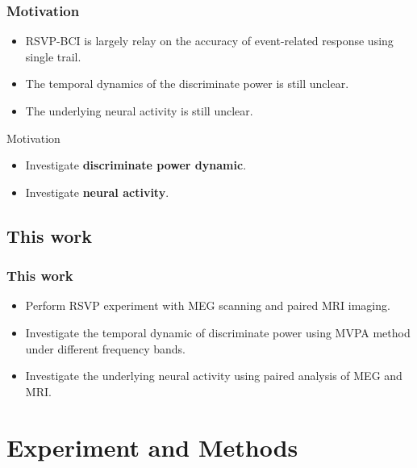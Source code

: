 \documentclass[aspectratio=169]{beamer}
\begin{document}
\begin{frame}
    \frametitle{Motivation}

    \begin{itemize}
        \item RSVP-BCI is largely relay on the accuracy of event-related response using single trail.
        \item The temporal dynamics of the discriminate power is still unclear.
        \item The underlying neural activity is still unclear.
    \end{itemize}

    \pause

    \begin{block}{Motivation}

        \begin{itemize}
            \item Investigate \textbf{discriminate power dynamic}.
            \item Investigate \textbf{neural activity}.
        \end{itemize}

    \end{block}

\end{frame}

\subsection{This work}

\begin{frame}
    \frametitle{This work}

    \begin{itemize}
        \item Perform RSVP experiment with MEG scanning and paired MRI imaging.
        \item Investigate the temporal dynamic of discriminate power using MVPA method under different frequency bands.
        \item Investigate the underlying neural activity using paired analysis of MEG and MRI.
    \end{itemize}

\end{frame}

\section{Experiment and Methods}
\end{document}
